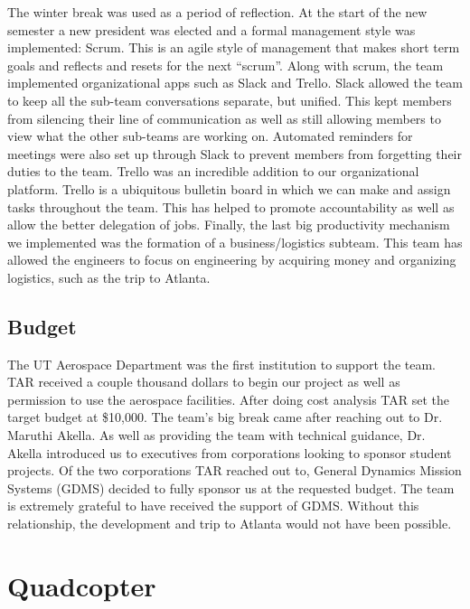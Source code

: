 \documentclass[12pt]{article}
\begin{document}
The winter break was used as a period of reflection. At the start of the new semester a new president was elected and a formal management style was implemented: Scrum. This is an agile style of management that makes short term goals and reflects and resets for the next “scrum”. Along with scrum, the team implemented organizational apps such as Slack and Trello. Slack allowed the team to keep all the sub-team conversations separate, but unified. This kept members from silencing their line of communication as well as still allowing members to view what the other sub-teams are working on. Automated reminders for meetings were also set up through Slack to prevent members from forgetting their duties to the team. Trello was an incredible addition to our organizational platform. Trello is a ubiquitous bulletin board in which we can make and assign tasks throughout the team. This has helped to promote accountability as well as allow the better delegation of jobs. Finally, the last big productivity mechanism we implemented was the formation of a business/logistics subteam. This team has allowed the engineers to focus on engineering by acquiring money and organizing logistics, such as the trip to Atlanta. 

\subsection{Budget}
The UT Aerospace Department was the first institution to support the team. TAR received a couple thousand dollars to begin our project as well as permission to use the aerospace facilities. After doing cost analysis TAR set the target budget at \$10,000. The team’s big break came after reaching out to Dr. Maruthi Akella. As well as providing the team with technical guidance, Dr. Akella introduced us to executives from corporations looking to sponsor student projects. Of the two corporations TAR reached out to, General Dynamics Mission Systems (GDMS) decided to fully sponsor us at the requested budget. The team is extremely grateful to have received the support of GDMS. Without this relationship, the development and trip to Atlanta would not have been possible. 

\section{Quadcopter}
\end{document}
